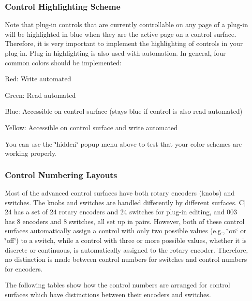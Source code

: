 \hypertarget{a00363_subsection_control_highlighting_scheme}{}\subsubsection{Control Highlighting Scheme}\label{a00363_subsection_control_highlighting_scheme}
Note that plug-\/in controls that are currently controllable on any page of a plug-\/in will be highlighted in blue when they are the active page on a control surface. Therefore, it is very important to implement the highlighting of controls in your plug-\/in. Plug-\/in highlighting is also used with automation. In general, four common colors should be implemented\+: 
\begin{DoxyItemize}
\item Red\+: Write automated  
\item Green\+: Read automated 
\item Blue\+: Accessible on control surface (stays blue if control is also read automated)  
\item Yellow\+: Accessible on control surface and write automated  
\end{DoxyItemize}

You can use the \char`\"{}hidden\char`\"{} popup menu above to test that your color schemes are working properly.

\hypertarget{a00363_subsection_control_numbering_layouts}{}\subsubsection{Control Numbering Layouts}\label{a00363_subsection_control_numbering_layouts}
Most of the advanced control surfaces have both rotary encoders (knobs) and switches. The knobs and switches are handled differently by different surfaces. C$\vert$24 has a set of 24 rotary encoders and 24 switches for plug-\/in editing, and 003 has 8 encoders and 8 switches, all set up in pairs. However, both of these control surfaces automatically assign a control with only two possible values (e.\+g., \char`\"{}on\char`\"{} or \char`\"{}off\char`\"{}) to a switch, while a control with three or more possible values, whether it is discrete or continuous, is automatically assigned to the rotary encoder. Therefore, no distinction is made between control numbers for switches and control numbers for encoders.

The following tables show how the control numbers are arranged for control surfaces which have distinctions between their encoders and switches.


